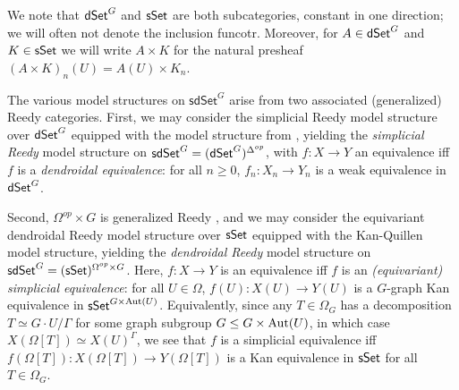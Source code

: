 \documentclass[a4paper,10pt
,draft
]{article}%
\renewcommand{\1}{\eta}%
\begin{document}
We note that $\mathsf{dSet}^G$ and $\mathsf{sSet}$ are both subcategories, constant in one direction;
we will often not denote the inclusion funcotr.
Moreover, for $A \in \mathsf{dSet}^G$ and $K \in \mathsf{sSet}$ we will write $A \times K$ for the natural presheaf $(A \times K)_n(U) = A(U) \times K_n$.

The various model structures on $\mathsf{sdSet}^G$ arise from two associated (generalized) Reedy categories.
First, we may consider the simplicial Reedy model structure over $\mathsf{dSet}^G$ equipped with the model structure from \cite{Per18},
yielding the \textit{simplicial Reedy} model structure on $\mathsf{sdSet}^G = (\mathsf{dSet}^G)^{\Delta^{op}}$,
with $f \colon X \to Y$ an equivalence iff $f$ is a \textit{dendroidal equivalence}: for all $n \geq 0$, $f_n: X_n \to Y_n$ is a weak equivalence in $\mathsf{dSet}^G$.

Second, $\Omega^{op} \times G$ is generalized Reedy \cite[Example A.7]{BP_edss},
and we may consider the equivariant dendroidal Reedy model structure over $\mathsf{sSet}$ equipped with the Kan-Quillen model structure,
yielding the \textit{dendroidal Reedy} model structure on $\mathsf{sdSet}^G = (\mathsf{sSet})^{\Omega^{op} \times G}$.
Here, $f\colon X \to Y$ is an equivalence iff $f$ is an \textit{(equivariant) simplicial equivalence}:
for all $U \in \Omega$, $f(U) \colon X(U) \to Y(U)$ is a $G$-graph Kan equivalence in $\mathsf{sSet}^{G \times \operatorname{Aut}(U)}$.
Equivalently, since any $T \in \Omega_G$ has a decomposition $T \simeq G \cdot U/\Gamma$ for some graph subgroup $G \leq G \times \operatorname{Aut}(U)$,
in which case $X(\Omega[T]) \simeq X(U)^\Gamma$,
we see that $f$ is a simplicial equivalence iff $f(\Omega[T]) \colon X(\Omega[T]) \to Y(\Omega[T])$ is a Kan equivalence in $\mathsf{sSet}$ for all $T \in \Omega_G$.
\end{document}
